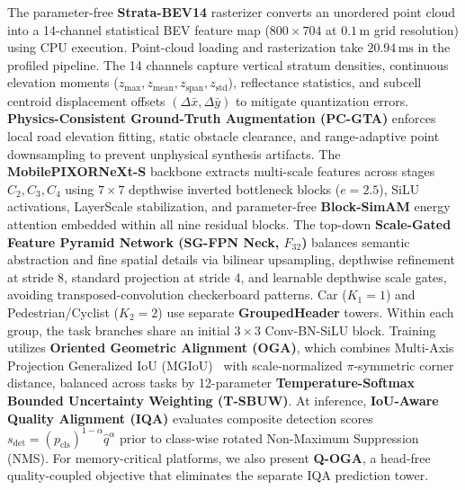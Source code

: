 The parameter-free \textbf{Strata-BEV14} rasterizer converts an unordered point cloud into a 14-channel statistical BEV feature map ($800 \times 704$ at $0.1\,\text{m}$ grid resolution) using CPU execution. Point-cloud loading and rasterization take $20.94\,\text{ms}$ in the profiled pipeline. The 14 channels capture vertical stratum densities, continuous elevation moments ($z_{\max}, z_{\mathrm{mean}}, z_{\mathrm{span}}, z_{\mathrm{std}}$), reflectance statistics, and subcell centroid displacement offsets $(\Delta\bar{x}, \Delta\bar{y})$ to mitigate quantization errors. \textbf{Physics-Consistent Ground-Truth Augmentation (PC-GTA)} enforces local road elevation fitting, static obstacle clearance, and range-adaptive point downsampling to prevent unphysical synthesis artifacts. The \textbf{MobilePIXORNeXt-S} backbone extracts multi-scale features across stages $C_2, C_3, C_4$ using $7 \times 7$ depthwise inverted bottleneck blocks ($e=2.5$), SiLU activations, LayerScale stabilization, and parameter-free \textbf{Block-SimAM} energy attention embedded within all nine residual blocks. The top-down \textbf{Scale-Gated Feature Pyramid Network (SG-FPN Neck, $F_{32}$)} balances semantic abstraction and fine spatial details via bilinear upsampling, depthwise refinement at stride 8, standard projection at stride 4, and learnable depthwise scale gates, avoiding transposed-convolution checkerboard patterns. Car ($K_1=1$) and Pedestrian/Cyclist ($K_2=2$) use separate \textbf{GroupedHeader} towers. Within each group, the task branches share an initial $3 \times 3$ Conv-BN-SiLU block. Training utilizes \textbf{Oriented Geometric Alignment (OGA)}, which combines Multi-Axis Projection Generalized IoU (MGIoU)~\cite{le2026mgiou} with scale-normalized $\pi$-symmetric corner distance, balanced across tasks by 12-parameter \textbf{Temperature-Softmax Bounded Uncertainty Weighting (T-SBUW)}. At inference, \textbf{IoU-Aware Quality Alignment (IQA)} evaluates composite detection scores $s_{\mathrm{det}} = (p_{\mathrm{cls}})^{1-\alpha} \hat{q}^\alpha$ prior to class-wise rotated Non-Maximum Suppression (NMS). For memory-critical platforms, we also present \textbf{Q-OGA}, a head-free quality-coupled objective that eliminates the separate IQA prediction tower.

